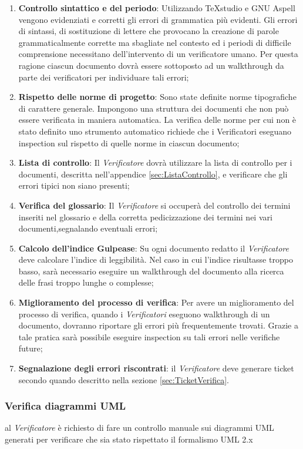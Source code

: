 	\begin{enumerate}
	\item \textbf{Controllo sintattico e del periodo}: Utilizzando TeXstudio e GNU Aspell vengono evidenziati e corretti gli errori di grammatica più evidenti. Gli errori di sintassi, di sostituzione di lettere che provocano la creazione di parole grammaticalmente corrette ma sbagliate nel contesto ed i periodi di difficile comprensione necessitano dell’intervento di un verificatore umano. Per questa ragione ciascun documento dovrà essere sottoposto ad un walkthrough da parte dei verificatori per individuare tali errori;
	\item \textbf{Rispetto delle norme di progetto}: Sono state definite norme tipografiche di carattere generale. Impongono una struttura dei documenti che non può essere verificata in maniera automatica. La verifica delle norme
	per cui non è stato definito uno strumento automatico richiede che i Verificatori eseguano inspection sul rispetto di quelle norme in ciascun documento;
	\item \textbf{Lista di controllo}: Il \emph{Verificatore} dovrà utilizzare la lista di controllo per i
	documenti, descritta nell’appendice \ref{sec:ListaControllo}, e verificare che gli errori tipici non siano	presenti;
	\item \textbf{Verifica del glossario}: Il \emph{Verificatore} si occuperà del controllo dei termini inseriti nel glossario e della corretta pedicizzazione dei termini nei vari documenti,segnalando eventuali errori;
	\item \textbf{Calcolo dell’indice Gulpease}: Su ogni documento redatto il \emph{Verificatore} deve calcolare l’indice di leggibilità. Nel caso in cui l’indice risultasse troppo basso, sarà necessario eseguire un walkthrough del documento alla ricerca delle frasi troppo lunghe o complesse;
	\item \textbf{Miglioramento del processo di verifica}: Per avere un miglioramento del processo di verifica, quando i \emph{Verificatori} eseguono walkthrough di un documento, dovranno riportare gli errori più frequentemente trovati. Grazie a tale pratica sarà possibile eseguire inspection su tali errori nelle verifiche future;
	\item \textbf{Segnalazione degli errori riscontrati}: il \emph{Verificatore} deve generare ticket secondo quando descritto nella
	sezione \ref{sec:TicketVerifica}.
	\end{enumerate}
	\subsubsection{Verifica diagrammi UML}
	\label{sec:strumentiVerifica}
	al \emph{Verificatore} è richiesto di fare un controllo manuale sui diagrammi UML generati per verificare che sia stato rispettato il formalismo UML 2.x
